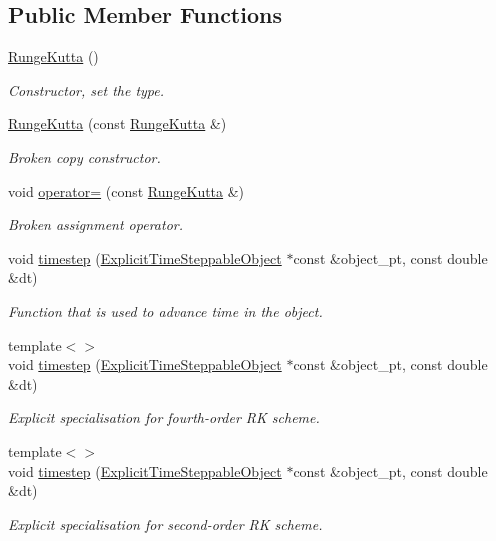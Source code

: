 \subsection*{Public Member Functions}
\begin{DoxyCompactItemize}
\item 
\hyperlink{classoomph_1_1RungeKutta_a31a3f1886f1243e7a7b9fb10f999a017}{Runge\+Kutta} ()
\begin{DoxyCompactList}\small\item\em Constructor, set the type. \end{DoxyCompactList}\item 
\hyperlink{classoomph_1_1RungeKutta_a26001afd775b24e25043fb0a2d449248}{Runge\+Kutta} (const \hyperlink{classoomph_1_1RungeKutta}{Runge\+Kutta} \&)
\begin{DoxyCompactList}\small\item\em Broken copy constructor. \end{DoxyCompactList}\item 
void \hyperlink{classoomph_1_1RungeKutta_a06cc882a44817b7c894b3e7dc04fc79e}{operator=} (const \hyperlink{classoomph_1_1RungeKutta}{Runge\+Kutta} \&)
\begin{DoxyCompactList}\small\item\em Broken assignment operator. \end{DoxyCompactList}\item 
void \hyperlink{classoomph_1_1RungeKutta_a53a492b4190ccd3dfc0b4af35b2c240f}{timestep} (\hyperlink{classoomph_1_1ExplicitTimeSteppableObject}{Explicit\+Time\+Steppable\+Object} $\ast$const \&object\+\_\+pt, const double \&dt)
\begin{DoxyCompactList}\small\item\em Function that is used to advance time in the object. \end{DoxyCompactList}\item 
{\footnotesize template$<$$>$ }\\void \hyperlink{classoomph_1_1RungeKutta_a506750a0c4fe555f434dadf139ad4f07}{timestep} (\hyperlink{classoomph_1_1ExplicitTimeSteppableObject}{Explicit\+Time\+Steppable\+Object} $\ast$const \&object\+\_\+pt, const double \&dt)
\begin{DoxyCompactList}\small\item\em Explicit specialisation for fourth-\/order RK scheme. \end{DoxyCompactList}\item 
{\footnotesize template$<$$>$ }\\void \hyperlink{classoomph_1_1RungeKutta_a41922b5bf83c9a719106cbb7b862ee51}{timestep} (\hyperlink{classoomph_1_1ExplicitTimeSteppableObject}{Explicit\+Time\+Steppable\+Object} $\ast$const \&object\+\_\+pt, const double \&dt)
\begin{DoxyCompactList}\small\item\em Explicit specialisation for second-\/order RK scheme. \end{DoxyCompactList}\end{DoxyCompactItemize}
